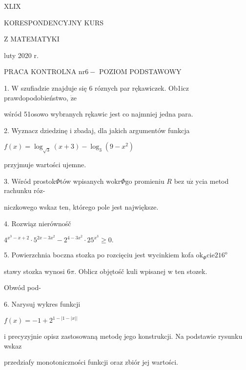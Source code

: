 \documentclass[a4paper,12pt]{article}
\begin{document}
XLIX

KORESPONDENCYJNY KURS

Z MATEMATYKI

luty 2020 r.

PRACA KONTROLNA $\mathrm{n}\mathrm{r} 6-$ POZIOM PODSTAWOWY

1. $\mathrm{W}$ szufiadzie znajduje się 6 róznych par rękawiczek. Ob1icz prawdopodobieństwo, $\dot{\mathrm{z}}\mathrm{e}$

wśród 51osowo wybranych rękawic jest co najmniej jedna para.

2. Wyznacz dziedzinę $\mathrm{i}$ zbadaj, dla jakich argumentów funkcja

$f(x)=\log_{\sqrt{3}}(x+3)-\log_{3}(9-x^{2})$

przyjmuje wartości ujemne.

3. Wśród prostok$\Phi$tów wpisanych $\mathrm{w}\mathrm{o}\mathrm{k}\mathrm{r}\Phi \mathrm{g}\mathrm{o}$ promieniu $R$ bez $\mathrm{u}\dot{\mathrm{z}}$ ycia metod rachunku róz-

niczkowego wskaz ten, którego pole jest największe.

4. Rozwiąz nierównośč

$4^{x^{3}-x+2}\cdot 5^{2x-3x^{2}}-2^{4-3x^{2}}\cdot 25^{x^{3}}\geq 0.$

5. Powierzchnia boczna stozka po rozcięciu jest wycinkiem kofa $\mathrm{o}\mathrm{k}_{\Phi}\mathrm{c}\mathrm{i}\mathrm{e}216^{\mathrm{o}}$

stawy stozka wynosi $ 6\pi$. Oblicz objętośč kuli wpisanej $\mathrm{w}$ ten stozek.

Obwód pod-

6. Narysuj wykres funkcji

$f(x)=-1+2^{1-|1-|x||}$

i precyzyjnie opisz zastosowaną metodę jego konstrukcji. Na podstawie rysunku wskaz

przedziafy monotoniczności funkcji oraz zbiór jej wartości.
\end{document}
